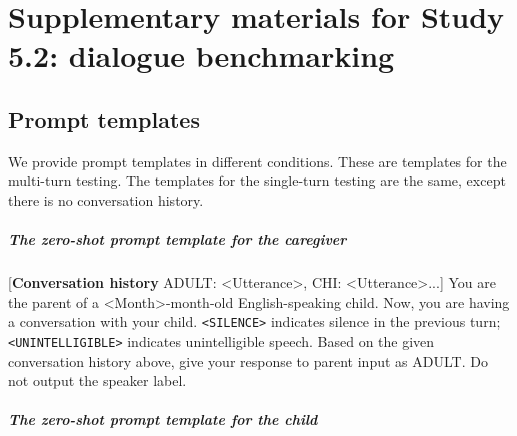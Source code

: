 \chapter[Supplementary materials for Study 5.2]{Supplementary materials for Study 5.2: dialogue benchmarking}
\label{app:dialogue}
\begingroup
\graphicspath{{ch5/papers/LLM_benchmark/}}

\setlength{\parskip}{6pt}




\section{Prompt templates}
\label{sec:prompts}
We provide prompt templates in different conditions. These are templates for the multi-turn testing. The templates for the single-turn testing are the same, except there is no conversation history.


\paragraph{The zero-shot prompt template for the caregiver}


[\textbf{Conversation history} ADULT: \textless Utterance\textgreater, CHI: \textless Utterance\textgreater ...]
You are the parent of a \textless Month\textgreater-month-old English-speaking child. Now, you are having a conversation with your child. \texttt{<SILENCE>} indicates silence in the previous turn; \texttt{<UNINTELLIGIBLE>} indicates unintelligible speech. Based on the given conversation history above, give your response to parent input as ADULT. Do not output the speaker label. 



\paragraph{The zero-shot prompt template for the child}


